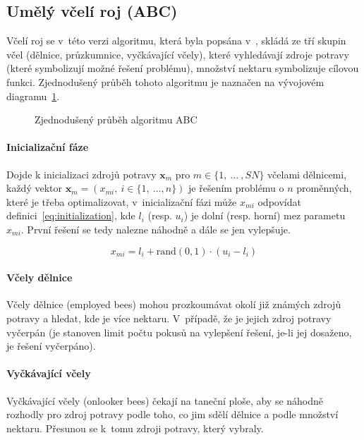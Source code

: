 \documentclass[twoside]{ctuthesis}
\begin{document}
\subsection{Umělý včelí roj (ABC)}
Včelí roj se v~této verzi algoritmu, která byla popsána v~\cite{karaboga2010artificial}, skládá ze tří skupin včel (dělnice, průzkumnice, vyčkávající včely), které vyhledávají zdroje potravy (které symbolizují možné řešení problému), množství nektaru symbolizuje cílovou funkci. \cite{anuar2016modified} Zjednodušený průběh tohoto algoritmu je naznačen na vývojovém diagramu~\ref{fig:abcflow}.

\begin{figure}[h]
	
	\caption{Zjednodušený průběh algoritmu ABC}
	\label{fig:abcflow}
\end{figure}

\paragraph{Inicializační fáze}
Dojde k inicializaci zdrojů potravy $\boldsymbol{x}_m$ pro $m \in \{1,~\ldots~, SN\}$ včelami dělnicemi, každý vektor $\boldsymbol{x}_m = (x_{mi},~i \in \{1,~\ldots, n \})$ je řešením problému o $n$ proměnných, které je třeba optimalizovat, v~inicializační fázi může $x_{mi}$ odpovídat definici~\ref{eq:initialization}, kde $l_i$ (resp. $u_i$) je dolní (resp. horní) mez parametu $x_{mi}$. První řešení se tedy nalezne náhodně a dále se jen vylepšuje.
\cite{karaboga2010artificial}

\begin{equation}
	\label{eq:initialization}
	x_{mi} = l_i + \mbox{rand}(0,1) \cdot (u_i - l_i)
\end{equation}

\paragraph{Včely dělnice}
Včely dělnice (employed bees) mohou prozkoumávat okolí již známých zdrojů potravy a hledat, kde je více nektaru. V~případě, že je jejich zdroj potravy vyčerpán (je stanoven limit počtu pokusů na vylepšení řešení, je-li jej dosaženo, je řešení vyčerpáno).

\paragraph{Vyčkávající včely}
Vyčkávající včely (onlooker bees) čekají na taneční ploše, aby se náhodně rozhodly pro zdroj potravy podle toho, co jim sdělí dělnice a podle množství nektaru. Přesunou se k~tomu zdroji potravy, který vybraly.
\end{document}
